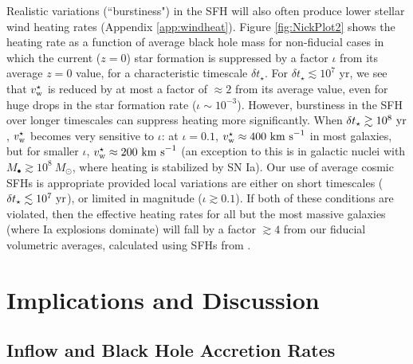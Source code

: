 \documentclass[usenatbib,fleqn]{mn2e}
\begin{document}
Realistic variations (``burstiness") in the SFH
will also often produce lower stellar wind heating rates (Appendix
\ref{app:windheat}).  Figure \ref{fig:NickPlot2} shows the heating
rate as a function of average black hole mass for non-fiducial cases
in which the current ($z = 0$) star formation is suppressed by a
factor $\iota$ from its average $z = 0$ value, for a characteristic
timescale $\delta t_{\star}$.  For $\delta t_{\star} \lesssim 10^{7}$
yr, we see that $v_{\rm w}^{\star}$ is reduced by at most a factor of
$\approx 2$ from its average value, even for huge drops in the star
formation rate ($\iota \sim 10^{-3}$).  However, burstiness in the
SFH over longer timescales can suppress heating
more significantly.  When $\delta t_{\star} \gtrsim 10^8~{\rm yr}$,
$v_{\rm w}^\star$ becomes very sensitive to $\iota$: at $\iota=0.1$,
$v_{\rm w}^\star \approx 400~{\rm km~s}^{-1}$ in most galaxies, but
for smaller $\iota$, $v_{\rm w}^\star \approx 200~{\rm km~s}^{-1}$ (an
exception to this is in galactic nuclei with $M_\bullet \gtrsim
10^8~M_\odot$, where heating is stabilized by SN Ia).  Our use
of average cosmic SFHs is appropriate provided
local variations are either on short timescales ($\delta t_{\star}
\lesssim 10^7~{\rm yr}$), or limited in magnitude ($\iota \gtrsim
0.1$).  If both of these conditions are violated, then the effective
heating rates for all but the most massive galaxies (where Ia
explosions dominate) will fall by a factor $\gtrsim 4$ from our
fiducial volumetric averages, calculated using SFHs from \citet{MosterNaab+:2013a}.


\section{Implications and Discussion}
\label{sec:discussion}

\subsection{Inflow and Black Hole Accretion Rates}
\label{sec:mdot}
\end{document}
